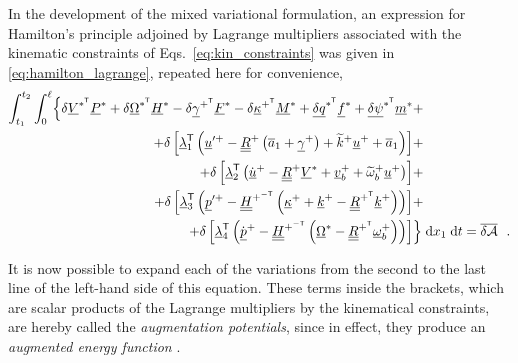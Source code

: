 \documentclass[12pt,a4paper,oneside,english]{abntex2} %
\newcommand{\vect}[1]{\underline{#1}}
\newcommand{\uvec}[1]{\overline{#1}}
\def\tens#1{\underline{\underline{#1}}}
\def\til#1{\widetilde{#1}}
\def\lb{\left[}
\def\rb{\right]}
\def\lp{\left(}
\def\rp{\right)}
\def\T{\mathsf{T}}
\def\A{\mathcal{A}}
\def\xo{x_1}
\def\aone{\uvec{a}_1}
\def\R{\tens{R}}
\def\Rp{\R^+}
\def\RpT{\R^{+^\T}}
\def\u{\vect{u}}
\def\uplus{\u^{+}}
\def\updot{\dot{\u}^{+}}
\def\upprime{\u^{\prime+}}
\def\vb{\vect{v}_b}
\def\vbplus{\vb^{+}}
\def\om{\vect{\omega}_b}
\def\omp{\om^{+}}
\def\omtil{\til{\omega}_b}
\def\omtilp{\omtil^{+}}
\def\gam{\vect{\gamma}}
\def\gamp{\gam^{+}}
\def\gampT{\gam^{+^\T}}
\def\kap{\vect{\kappa}}
\def\kapp{\kap^{+}}
\def\kappT{\kap^{+^\T}}
\def\k{\vect{k}}
\def\kp{\k^{+}}
\def\ktil{\til{k}}
\def\ktilp{\ktil^{+}}
\def\V{\vect{V}}
\def\Vs{\V^{*}}
\def\VsT{\V^{*^\T}}
\def\Om{\vect{\Omega}}
\def\Oms{\Om^{*}}
\def\OmsT{\Om^{*^\T}}
\def\P{\vect{P}}
\def\Ps{\P^*}
\def\Hv{\vect{H}}
\def\Hvs{\Hv^*}
\def\H{\tens{H}}
\def\HpmT{\H^{+^{-\T}}}
\def\p{\vect{p}}
\def\pdot{\dot{\p}}
\def\ppdot{\pdot^{+}}
\def\ppprime{\p^{\prime{+}}}
\def\F{\vect{F}}
\def\Fs{\F^*}
\def\M{\vect{M}}
\def\Ms{\M^*}
\def\f{\vect{f}}
\def\fs{\f^*}
\def\m{\vect{m}}
\def\ms{\m^*}
\def\delq{\vect{\delta q}}
\def\delqsT{\delq^{*^\T}}
\def\delpsi{\vect{\delta\psi}}
\def\delpsisT{\delpsi^{*^\T}}
\def\lamb{\vect{\lambda}}
\def\intt{\int_{t_1}^{t_2}}
\def\intl{\int_{0}^{\ell}}
\def\d{\textnormal{d}}
\begin{document}
\begin{apendicesenv}
In the development of the mixed variational formulation, an expression for Hamilton's principle adjoined by Lagrange multipliers associated with the kinematic constraints of Eqs.~\eqref{eq:kin_constraints} was given in \cref{eq:hamilton_lagrange}, repeated here for convenience,
\begin{align}
	\intt\intl \Bigl\{\Bigr. \delta\VsT\Ps + \delta\OmsT\Hvs - \delta\gampT\Fs - \delta\kappT\Ms + \delqsT\fs + \delpsisT\ms &+ \nonumber \\ + \delta\lb\lamb_1^\T\lp\upprime-\Rp\lp\aone+\gamp\rp+\ktilp\uplus+\aone\rp\rb &+ \nonumber \\
	+ \delta\lb\lamb_2^\T\lp\updot-\Rp\Vs+\vbplus+\omtilp\uplus\rp\rb &+ 
	\nonumber \\
	+\delta\lb\lamb_3^\T\lp\ppprime-\HpmT\lp\kapp+\kp-\RpT\kp\rp\rp\rb &+ 
	\nonumber \\
	+\delta\lb\lamb_4^\T\lp\ppdot-\HpmT\lp\Oms-\RpT\omp\rp\rp\rb &\Bigl.\Bigr\} \;\d \xo\;\d t = \overline{\delta\A} \ \ .
    \label{eq:hamilton_lagrange_copy}
\end{align}

It is now possible to expand each of the variations from the second to the last line of the left-hand side of this equation. These terms inside the brackets, which are scalar products of the Lagrange multipliers by the kinematical constraints, are hereby called the \textit{augmentation potentials}, since in effect, they produce an \textit{augmented energy function} \cite{bauchau2011flexible}. 


\end{apendicesenv}
\end{document}
